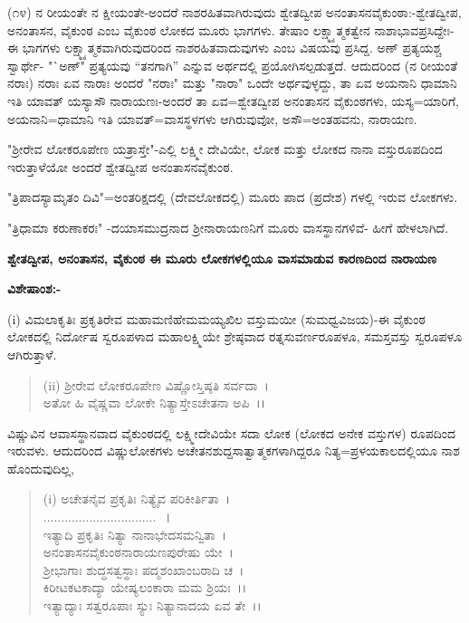 (೧೪) ನ ರೀಯಂತೇ ನ ಕ್ಷೀಯಂತೇ-ಅಂದರೆ ನಾಶರಹಿತವಾಗಿರುವುದು ಶ್ವೇತದ್ವೀಪ ಅನಂತಾಸನವೈಕುಂಠಾ:-ಶ್ವೇತದ್ವೀಪ, ಅನಂತಾಸನ, ವೈಕುಂಠ ಎಂಬ ವೈಕುಂಠ ಲೋಕದ ಮೂರು ಭಾಗಗಳು. ತೇಷಾಂ ಲಕ್ಷ್ಮ್ಯಾತ್ಮಕತ್ವೇನ ನಾಶಾಭಾವಪ್ರಸಿದ್ದೇಃ- ಈ ಭಾಗಗಳು ಲಕ್ಷ್ಮ್ಯಾತ್ಮಕವಾಗಿರುವುದರಿಂದ ನಾಶರಹಿತವಾದುವುಗಳು ಎಂಬ ವಿಷಯವು ಪ್ರಸಿದ್ದ. ಅಣ್ ಪ್ರತ್ಯಯಶ್ಚ ಸ್ವಾರ್ಥೇ- "`ಅಣ್" ಪ್ರತ್ಯಯವು “ತನಗಾಗಿ'' ಎನ್ನುವ ಅರ್ಥದಲ್ಲಿ ಪ್ರಯೋಗಿಸಲ್ಪಡುತ್ತದೆ. ಆದುದರಿಂದ (ನ ರೀಯಂತೆ ನರಾಃ) ನರಾಃ ಏವ ನಾರಾಃ ಅಂದರೆ "ನರಾಃ" ಮತ್ತು "ನಾರಾ" ಒಂದೇ ಅರ್ಥವುಳ್ಳದ್ದು, ತಾ ಏವ ಅಯನಾನಿ ಧಾಮಾನಿ ಇತಿ ಯಾವತ್‌ ಯಸ್ಯಾಸೌ ನಾರಾಯಣಃ-ಅಂದರೆ ತಾ ಏವ=ಶ್ವೇತದ್ವೀಪ ಅನಂತಾಸನ ವೈಕುಂಠಗಳು, ಯಸ್ಯ=ಯಾರಿಗೆ, ಅಯನಾನಿ=ಧಾಮಾನಿ ಇತಿ ಯಾವತ್=ವಾಸಸ್ಥಳಗಳು ಆಗಿರುವುವೋ, ಅಸೌ=ಅಂತಹವನು, ನಾರಾಯಣ.

"ಶ‍್ರೀರೇವ ಲೋಕರೂಪೇಣ ಯತ್ರಾಸ್ತೇ"-ಎಲ್ಲಿ ಲಕ್ಷ್ಮೀ ದೇವಿಯೇ, ಲೋಕ ಮತ್ತು ಲೋಕದ ನಾನಾ ವಸ್ತುರೂಪದಿಂದ ಇರುತ್ತಾಳೆಯೋ ಅಂದರೆ ಶ್ವೇತದ್ವೀಪ ಅನಂತಾಸನವೈಕುಂಠ.

"ತ್ರಿಪಾದಸ್ಯಾಮೃತಂ ದಿವಿ"=ಅಂತರಿಕ್ಷದಲ್ಲಿ (ದೇವಲೋಕದಲ್ಲಿ) ಮೂರು ಪಾದ (ಪ್ರದೇಶ) ಗಳಲ್ಲಿ ಇರುವ ಲೋಕಗಳು.

"ತ್ರಿಧಾಮಾ ಕರುಣಾಕರಃ" -ದಯಾಸಮುದ್ರನಾದ ಶ‍್ರೀನಾರಾಯಣನಿಗೆ ಮೂರು ವಾಸಸ್ಥಾನಗಳಿವೆ- ಹೀಗೆ ಹೇಳಲಾಗಿದೆ.

\textbf{ಶ್ವೇತದ್ವೀಪ, ಅನಂತಾಸನ, ವೈಕುಂಠ ಈ ಮೂರು ಲೋಕಗಳಲ್ಲಿಯೂ ವಾಸಮಾಡುವ ಕಾರಣದಿಂದ ನಾರಾಯಣ}

\noindent
\textbf{ವಿಶೇಷಾಂಶ:-}

(i) ವಿಮಲಾಕೃತಿಃ ಪ್ರಕೃತಿರೇವ ಮಹಾಮಣಿಹೇಮಮಯ್ಯಖಿಲ ವಸ್ತುಮಯೀ (ಸುಮಧ್ವವಿಜಯ)-ಈ ವೈಕುಂಠ ಲೋಕದಲ್ಲಿ ನಿರ್ದೋಷ ಸ್ವರೂಪಳಾದ ಮಹಾಲಕ್ಷ್ಮಿಯೇ ಶ್ರೇಷ್ಠವಾದ ರತ್ನಸುವರ್ಣರೂಪಳೂ, ಸಮಸ್ತವಸ್ತು ಸ್ವರೂಪಳೂ ಆಗಿರುತ್ತಾಳೆ.

\begin{verse}
(ii) ಶ‍್ರೀರೇವ ಲೋಕರೂಪೇಣ ವಿಷ್ಣೋಸ್ತಿಷ್ಠತಿ ಸರ್ವದಾ~।\\ ಅತೋ ಹಿ ವೈಷ್ಣವಾ ಲೋಕೇ ನಿತ್ಯಾಸ್ತೇಽಚೇತನಾ ಅಪಿ~।।
\end{verse}


ವಿಷ್ಣುವಿನ ಆವಾಸಸ್ಥಾನವಾದ ವೈಕುಂಠದಲ್ಲಿ ಲಕ್ಷ್ಮೀದೇವಿಯೇ ಸದಾ ಲೋಕ (ಲೋಕದ ಅನೇಕ ವಸ್ತುಗಳ) ರೂಪದಿಂದ ಇರುವಳು. ಆದುದರಿಂದ ವಿಷ್ಣುಲೋಕಗಳು ಅಚೇತನಶುದ್ದಸಾತ್ವಾತ್ಮಕಗಳಾಗಿದ್ದರೂ ನಿತ್ಯ=ಪ್ರಳಯಕಾಲದಲ್ಲಿಯೂ ನಾಶ ಹೊಂದುವುದಿಲ್ಲ,

\begin{verse}
(i) ಅಚೇತನೈವ ಪ್ರಕೃತಿಃ ನಿತ್ಯೈವ ಪರಿಕೀರ್ತಿತಾ~।\\................................~।\\ ಇತ್ಯಾದಿ ಪ್ರಕೃತಿಃ ನಿತ್ಯಾ ನಾನಾಭೇದಸಮನ್ವಿತಾ~।\\ ಅನಂತಾಸನವೈಕುಂಠನಾರಾಯಣಪುರೇಷು ಯೇ~।\\ ಶ‍್ರೀಭಾಗಾಃ ಶುದ್ಧಸತ್ವಸ್ಥಾಃ ಪದ್ಮಶಂಖಾಂಬರಾದಿ ಚ~।\\ ಕಿರೀಟಕಟಕಾದ್ಯಾ ಯೇಷ್ಯಲಂಕಾರಾ ಮಮ ಶ್ರಿಯಃ~।।\\ ಇತ್ಯಾದ್ಯಾಃ ಸತ್ವರೂಪಾಃ ಸ್ಯುಃ ನಿತ್ಯಾನಾದಯ ಏವ ತೇ~।।
\end{verse}

